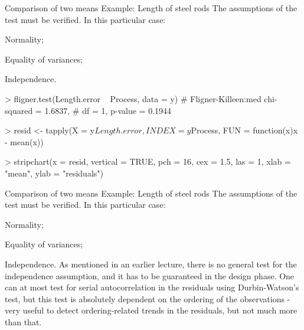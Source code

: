 \documentclass[t]{beamer}
\begin{document}
\begin{ftstf}
{Comparison of two means}
{Example: Length of steel rods}
The assumptions of the test must be verified. In this particular case:

\bitems Normality;
\item \alert{Equality of variances};
\item Independence.
\eitem
\begin{rcode}
> fligner.test(Length.error ~ Process, data = y)
# Fligner-Killeen:med chi-squared = 1.6837, 
# df = 1, p-value = 0.1944

> resid <- tapply(X = y$Length.error, 
         INDEX = y$Process, 
         FUN   = function(x){x - mean(x)})
         
> stripchart(x        = resid, 
             vertical = TRUE, 
             pch      = 16, 
             cex      = 1.5, 
             las      = 1, 
             xlab     = "mean",
             ylab     = "residuals")
\end{rcode}
\end{ftstf}


\begin{ftst}
{Comparison of two means}
{Example: Length of steel rods}
The assumptions of the test must be verified. In this particular case:

\bitems Normality;
\item Equality of variances;
\item \alert{Independence}.
\eitem
As mentioned in an earlier lecture, there is no general test for the independence assumption, and it has to be guaranteed in the design phase. 
\vhalf
One can at most test for serial autocorrelation in the residuals using Durbin-Watson's test, but this test is absolutely dependent on the ordering of the observations - very useful to detect ordering-related trends in the residuals, but not much more than that.
\end{ftst}
\end{document}
